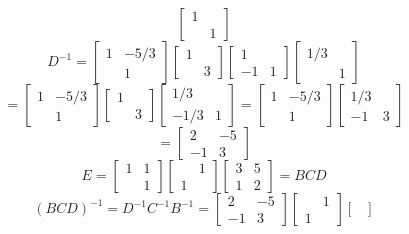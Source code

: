 \begin{itemize}
$$\begin{bmatrix}
1 & \\
& 1
\end{bmatrix}$$
$$D^{-1} = \begin{bmatrix}
1 & -5/3 \\
& 1
\end{bmatrix}\begin{bmatrix}
1 & \\
& 3
\end{bmatrix}\begin{bmatrix}
1 & \\
-1 & 1
\end{bmatrix}\begin{bmatrix}
1/3 & \\
& 1
\end{bmatrix}$$
$$= \begin{bmatrix}
1 & -5/3 \\
& 1
\end{bmatrix}\begin{bmatrix}
1 & \\
& 3
\end{bmatrix}\begin{bmatrix}
1/3 & \\
-1/3 & 1
\end{bmatrix} = \begin{bmatrix}
1 & -5/3 \\
& 1
\end{bmatrix}\begin{bmatrix}
1/3 & \\
-1 & 3
\end{bmatrix}$$
$$= \begin{bmatrix}
2 & -5 \\
-1 & 3
\end{bmatrix}$$
$$E = \begin{bmatrix}
1 & 1 \\
& 1
\end{bmatrix}\begin{bmatrix}
& 1 \\
1 &
\end{bmatrix}\begin{bmatrix}
3 & 5 \\
1 & 2
\end{bmatrix} = BCD$$
$$(BCD)^{-1} = D^{-1}C^{-1}B^{-1} = \begin{bmatrix}
2 & -5 \\
-1 & 3
\end{bmatrix}\begin{bmatrix}
& 1 \\
1 &
\end{bmatrix}\begin{bmatrix}

\end{bmatrix}$$
\end{itemize}
